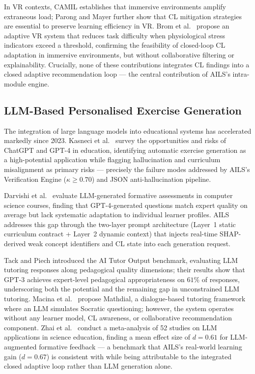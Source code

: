 \documentclass[ASNA,twocolumn]{USG} %
\begin{document}
In VR contexts, CAMIL \cite{Makransky2021} establishes that
immersive environments amplify extraneous load; Parong and
Mayer \cite{Parong2021} further show that CL mitigation
strategies are essential to preserve learning efficiency in VR.
Brom et al.\ \cite{Brom2020} propose an adaptive VR system
that reduces task difficulty when physiological stress
indicators exceed a threshold, confirming the feasibility of
closed-loop CL adaptation in immersive environments, but
without collaborative filtering or explainability.
Crucially, none of these contributions integrates CL findings
into a closed adaptive recommendation loop --- the central
contribution of AILS's intra-module engine.

\subsection{LLM-Based Personalised Exercise Generation}

The integration of large language models into educational
systems has accelerated markedly since 2023.
Kasneci et al.\ \cite{Kasneci2023} survey the opportunities
and risks of ChatGPT and GPT-4 in education, identifying
automatic exercise generation as a high-potential application
while flagging hallucination and curriculum misalignment as
primary risks --- precisely the failure modes addressed by
AILS's Verification Engine ($\kappa \geq 0.70$) and
JSON anti-hallucination pipeline.

Darvishi et al.\ \cite{Darvishi2024} evaluate LLM-generated
formative assessments in computer science courses, finding
that GPT-4-generated questions match expert quality on
average but lack systematic adaptation to individual learner
profiles.
AILS addresses this gap through the two-layer prompt
architecture (Layer~1 static curriculum contract +
Layer~2 dynamic context) that injects real-time
SHAP-derived weak concept identifiers and CL state into
each generation request.

Tack and Piech \cite{Tack2022} introduced the AI Tutor
Output benchmark, evaluating LLM tutoring responses along
pedagogical quality dimensions; their results show that
GPT-3 achieves expert-level pedagogical appropriateness on
$61\%$ of responses, underscoring both the potential and the
remaining gap in unconstrained LLM tutoring.
Macina et al.\ \cite{Macina2023} propose Mathdial, a
dialogue-based tutoring framework where an LLM simulates
Socratic questioning; however, the system operates without
any learner model, CL awareness, or collaborative
recommendation component.
Zhai et al.\ \cite{Zhai2024} conduct a meta-analysis of
52 studies on LLM applications in science education,
finding a mean effect size of $d{=}0.61$ for
LLM-augmented formative feedback --- a benchmark that
AILS's real-world learning gain ($d{=}0.67$) is consistent
with while being attributable to the integrated closed adaptive
loop rather than LLM generation alone.
\end{document}
